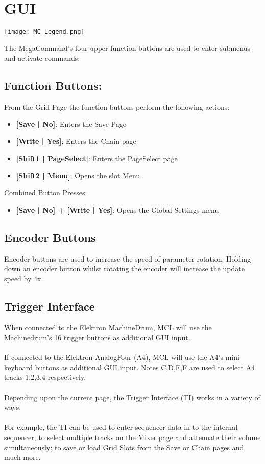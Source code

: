 \chapter{GUI}

\begin{center}
  \texttt{[image: MC\_Legend.png]}
\end{center}

The MegaCommand's four upper function buttons are used to enter submenus and activate commands:
\section{Function Buttons:}
From the Grid Page the function buttons perform the following actions:
\begin{itemize}
\item{\textbf{[Save | No]}: Enters the Save Page}
\item{\textbf{[Write | Yes]}: Enters the Chain page}
\item{\textbf{[Shift1 | PageSelect]}: Enters the PageSelect page}
\item{\textbf{[Shift2 | Menu]}: Opens the slot Menu }
\end{itemize}
Combined Button Presses:
\begin{itemize}
\item{\textbf{[Save | No] + [Write | Yes]}: Opens the Global Settings menu }
\end{itemize}

\section{Encoder Buttons}
Encoder buttons are used to increase the speed of parameter rotation.
Holding down an encoder button whilst rotating the encoder will increase the update speed by 4x.

\section{Trigger Interface}
When connected to the Elektron MachineDrum, MCL will use the Machinedrum's 16 trigger buttons as additional GUI input. \\
\\
If connected to the Elektron AnalogFour (A4), MCL will use the A4's mini keyboard buttons as additional GUI input. Notes C,D,E,F are used to select A4 tracks 1,2,3,4 respectively.\\
\\
Depending upon the current page, the Trigger Interface (TI) works in a variety of ways.\\
\\For example, the TI can be used to enter sequencer data in to the internal sequencer;
to select multiple tracks on the Mixer page and attenuate their volume simultaneously; to save or load Grid Slots from the Save or Chain pages and much more.


